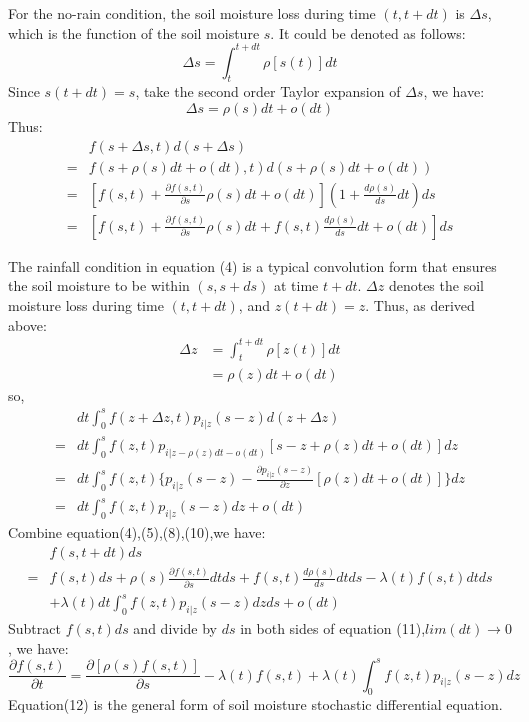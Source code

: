 \documentclass[11pt]{article}
\begin{document}
For the no-rain condition, the soil moisture loss during time $(t,t+dt)$ is $\Delta s$, which is the function of the soil moisture $s$. It could be denoted as follows:
\begin{equation}
\Delta s=\int_t^{t+dt} \rho[s(t)]dt
\end{equation}
Since $s(t+dt)= s$, take the second order Taylor expansion of $\Delta s$, we have:
\begin{equation}
\Delta s=\rho(s)dt+o(dt)
\end{equation}
Thus:
\begin{equation}
\begin{split}
&f(s+\Delta s,t)d(s+\Delta s)\\=&f(s+\rho(s)dt+o(dt),t)d(s+\rho(s)dt+o(dt))
\\=&[f(s,t)+\frac{\partial{f(s,t)}}{\partial s}\rho(s)dt+o(dt)](1+\frac{d\rho(s)}{ds}dt)ds
\\=&[f(s,t)+\frac{\partial{f(s,t)}}{\partial s}\rho(s)dt+f(s,t)\frac{d\rho(s)}{ds}dt+o(dt)]ds
\end{split}
\end{equation}

The rainfall condition in equation (4) is a typical convolution form that ensures the soil moisture to be within $(s,s+ds)$ at time $t+dt$. $\Delta z$ denotes the soil moisture loss during time $(t,t+dt)$, and 
$z(t+dt)=z$.  Thus, as derived above:
\begin{equation}
\begin{split}
\Delta z&=\int_t^{t+dt} \rho[z(t)]dt\\&=\rho(z)dt+o(dt)
\end{split}
\end{equation} 
so,
\begin{equation}
\begin{split}
 &dt\int_{0}^{s} f(z+\Delta z,t)p_{i|z}(s-z)d(z+\Delta z)\\=&dt\int_{0}^{s} f(z,t)p_{i|z-\rho(z)dt-o(dt)}[s-z+\rho(z)dt+o(dt)]dz\\=&dt\int_{0}^{s} f(z,t)\lbrace p_{i|z}(s-z)-\frac{\partial p_{i|z}(s-z)}{\partial z}[\rho(z)dt+o(dt)]\rbrace dz\\=&dt\int_{0}^{s} f(z,t)p_{i|z}(s-z)dz+o(dt)
 \end{split}
 \end{equation}
 Combine equation(4),(5),(8),(10),we have:
 \begin{equation}
 \begin{split}
 &f(s,t+dt)ds\\=&f(s,t)ds+\rho(s)\frac{\partial{f(s,t)}}{\partial s}dtds+f(s,t)\frac{d\rho(s)}{ds}dtds-\lambda(t)f(s,t)dtds\\&+\lambda(t)dt\int_{0}^{s} f(z,t)p_{i|z}(s-z)dzds+o(dt)
 \end{split}
 \end{equation}
 Subtract $f(s,t)ds$ and divide by $ds$ in both sides of equation (11),$lim(dt)\rightarrow0$, we have:
 \begin{equation}
 \frac{\partial{f(s,t)}}{\partial t}=\frac{\partial{[\rho(s)f(s,t)]}}{\partial s}-\lambda(t)f(s,t)+\lambda(t)\int_{0}^{s} f(z,t)p_{i|z}(s-z)dz
 \end{equation}
 Equation(12) is the general form of soil moisture stochastic differential equation.
\end{document}
